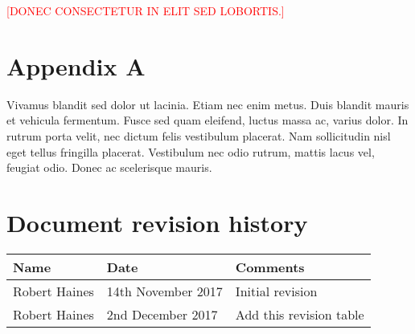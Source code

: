 \documentclass[11pt]{article}
\newcommand{\notetoself}[1]{\textcolor{red}{[\uppercase{#1}]}}
\begin{document}
\notetoself{Donec consectetur in elit sed lobortis.}

\appendix

\section{Appendix A}

Vivamus blandit sed dolor ut lacinia. Etiam nec enim metus. Duis blandit mauris et vehicula fermentum. Fusce sed quam eleifend, luctus massa ac, varius dolor. In rutrum porta velit, nec dictum felis vestibulum placerat. Nam sollicitudin nisl eget tellus fringilla placerat. Vestibulum nec odio rutrum, mattis lacus vel, feugiat odio. Donec ac scelerisque mauris.

\section{Document revision history}

\begin{tabularx}{\textwidth}{ |l|l|X| }
  \hline
  \textbf{Name} & \textbf{Date} & \textbf{Comments} \\
  \hline \hline
  Robert Haines & 14th November 2017 & Initial revision \\
  \hline
  Robert Haines & 2nd December 2017 & Add this revision table \\
  \hline
\end{tabularx}
\end{document}
